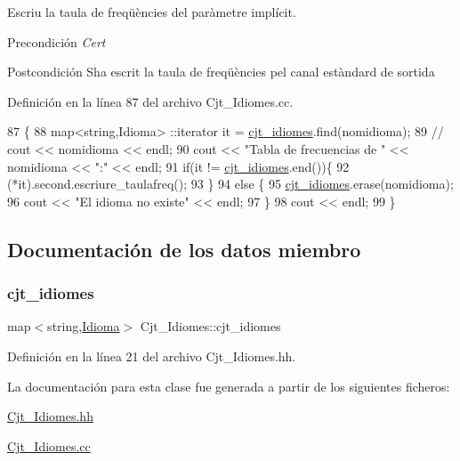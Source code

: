 Escriu la taula de freqüències del paràmetre implícit. 

\begin{DoxyPrecond}{Precondición}
{\itshape Cert} 
\end{DoxyPrecond}
\begin{DoxyPostcond}{Postcondición}
S\textquotesingle{}ha escrit la taula de freqüències pel canal estàndard de sortida 
\end{DoxyPostcond}


Definición en la línea 87 del archivo Cjt\+\_\+\+Idiomes.\+cc.


\begin{DoxyCode}
87                                                     \{
88     map<string,Idioma> ::iterator it = \hyperlink{class_cjt___idiomes_a1d294e628332477cbb3334cd8fb490a4}{cjt\_idiomes}.find(nomidioma);
89 \textcolor{comment}{//     cout << nomidioma << endl;}
90     cout << \textcolor{stringliteral}{"Tabla de frecuencias de "} << nomidioma << \textcolor{stringliteral}{":"} << endl;
91     \textcolor{keywordflow}{if}(it != \hyperlink{class_cjt___idiomes_a1d294e628332477cbb3334cd8fb490a4}{cjt\_idiomes}.end())\{
92         (*it).second.escriure\_taulafreq();
93     \}
94     \textcolor{keywordflow}{else} \{
95         \hyperlink{class_cjt___idiomes_a1d294e628332477cbb3334cd8fb490a4}{cjt\_idiomes}.erase(nomidioma);
96         cout << \textcolor{stringliteral}{"El idioma no existe"} << endl;
97     \}
98     cout << endl;    
99 \}
\end{DoxyCode}


\subsection{Documentación de los datos miembro}
\mbox{\label{class_cjt___idiomes_a1d294e628332477cbb3334cd8fb490a4}} 
\subsubsection{\texorpdfstring{cjt\+\_\+idiomes}{cjt\_idiomes}}
{\footnotesize\ttfamily map$<$string,\hyperlink{class_idioma}{Idioma}$>$ Cjt\+\_\+\+Idiomes\+::cjt\+\_\+idiomes\hspace{0.3cm}{\ttfamily [private]}}



Definición en la línea 21 del archivo Cjt\+\_\+\+Idiomes.\+hh.



La documentación para esta clase fue generada a partir de los siguientes ficheros\+:\begin{DoxyCompactItemize}
\item 
\hyperlink{_cjt___idiomes_8hh}{Cjt\+\_\+\+Idiomes.\+hh}\item 
\hyperlink{_cjt___idiomes_8cc}{Cjt\+\_\+\+Idiomes.\+cc}\end{DoxyCompactItemize}
